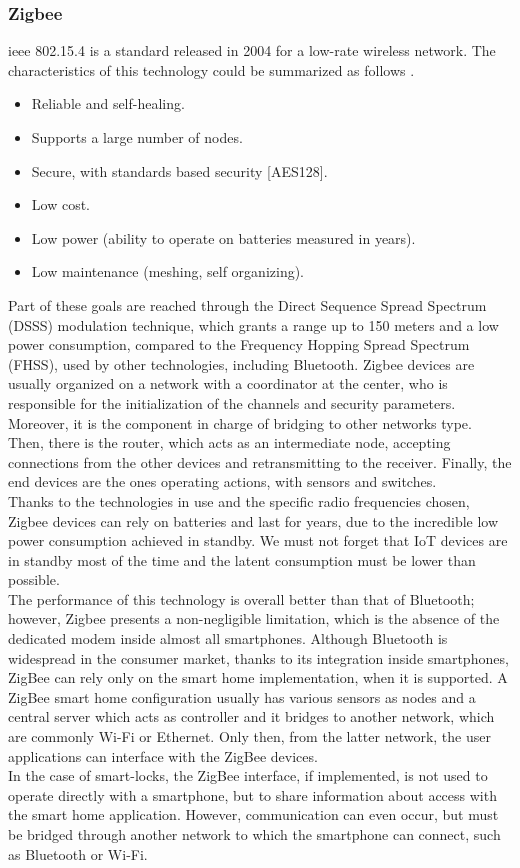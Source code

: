 \subsubsection{Zigbee}
\gls{ieee} 802.15.4 is a standard released in 2004 for a low-rate wireless network. The characteristics of this technology could be summarized as follows \cite{5942102}.
\begin{itemize}
    \item Reliable and self-healing.
    \item Supports a large number of nodes.
    \item Secure, with standards based security [AES128].
    \item Low cost.
    \item Low power (ability to operate on batteries
    measured in years).
    \item Low maintenance (meshing, self organizing).
\end{itemize}
Part of these goals are reached through the Direct Sequence Spread Spectrum (DSSS) modulation technique, which grants a range up to 150 meters and a low power consumption, compared to the Frequency Hopping Spread Spectrum (FHSS), used by other technologies, including Bluetooth.
Zigbee devices are usually organized on a network with a coordinator at the center, who is responsible for the initialization of the channels and security parameters. Moreover, it is the component in charge of bridging to other networks type. 
\\ Then, there is the router, which acts as an intermediate node, accepting connections from the other devices and retransmitting to the receiver. Finally, the end devices are the ones operating actions, with sensors and switches. 
\\ Thanks to the technologies in use and the specific radio frequencies chosen, Zigbee devices can rely on batteries and last for years, due to the incredible low power consumption achieved in standby. We must not forget that IoT devices are in standby most of the time and the latent consumption must be lower than possible. 
\\ The performance of this technology is overall better than that of Bluetooth; however, Zigbee presents a non-negligible limitation, which is the absence of the dedicated modem inside almost all smartphones. Although Bluetooth is widespread in the consumer market, thanks to its integration inside smartphones, ZigBee can rely only on the smart home implementation, when it is supported. A ZigBee smart home configuration usually has various sensors as nodes and a central server which acts as controller and it bridges to another network, which are commonly Wi-Fi or Ethernet. Only then, from the latter network, the user applications can interface with the ZigBee devices.
\\ In the case of smart-locks, the ZigBee interface, if implemented, is not used to operate directly with a smartphone, but to share information about access with the smart home application. However, communication can even occur, but must be bridged through another network to which the smartphone can connect, such as Bluetooth or Wi-Fi. 
